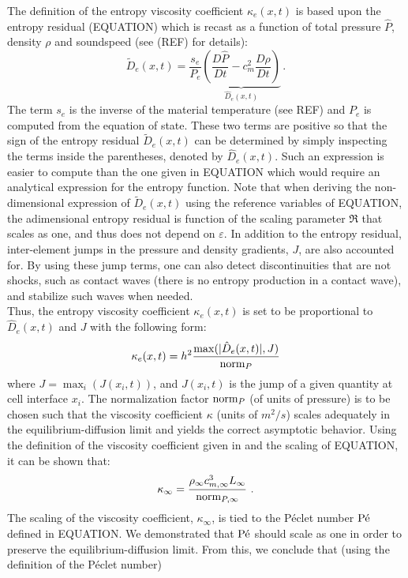 \documentclass[review]{elsarticle}
\begin{document}
The definition of the entropy viscosity coefficient $\kappa_e(x,t)$ is based upon the entropy residual (EQUATION) which is recast as a function of total pressure $\hat{P}$, density $\rho$ and soundspeed (see (REF) for details):
\begin{equation}
\label{eq:equation9}
\tilde{D}_e(x,t) = \frac{s_e}{P_e} \underbrace{ \left( \frac{D\hat{P}}{Dt} - c_m^2 \frac{D\rho}{Dt} \right)}_\textrm{$\hat{D}_e(x,t)$} \,.
\end{equation}
The term $s_e$ is the inverse of the material temperature (see REF) and $P_e$ is computed from the equation of state. These two terms are positive so that the sign of the entropy residual $\tilde{D}_e(x,t)$ can be determined by simply inspecting the terms inside the parentheses, denoted by $\hat{D}_e(x,t)$. Such an expression is easier to compute than the one given in EQUATION which would require an analytical expression for the entropy function. Note that when deriving the non-dimensional expression of $\tilde{D}_e(x,t)$ using the reference variables of EQUATION, the adimensional entropy residual is function of the scaling parameter $\Re$ that scales as one, and thus does not depend on $\varepsilon$. In addition to the entropy residual, inter-element jumps in the pressure and density gradients, $J$, are also accounted for. By using these jump terms, one can also detect discontinuities that are not shocks, such as contact waves (there is no entropy production in a contact wave), and stabilize such waves when needed. \\
Thus, the entropy viscosity coefficient $\kappa_e(x,t)$ is set to be proportional to $\hat{D}_e(x,t)$ and $J$ with the following form: 
\begin{equation}
\label{eq:equation12}
\kappa_e(x,t) = h^2 \frac{\max (|\hat{D}_e(x,t)|, J)}{\textrm{norm}_P}
\end{equation} 
where $J = \max_i (J(x_i,t))$, and $J(x_i,t)$ is the jump of a given quantity at cell interface $x_i$. The normalization factor $\textrm{norm}_P$ (of units of pressure) is to be chosen such that the viscosity coefficient $\kappa$ (units of $m^2/s$) scales adequately in the equilibrium-diffusion limit and yields the correct asymptotic behavior. Using the definition of the viscosity coefficient given in  and the scaling of EQUATION, it can be shown that:
%
\begin{equation}\label{eq:kappa_infty}
\kappa_\infty = \frac{\rho_\infty c^3_{m,\infty}  L_\infty}{\textrm{norm}_{P,\infty}} \ .
\end{equation}
%
The scaling of the viscosity coefficient, $\kappa_\infty$, is tied to the P\'eclet number $\textrm{P\'e}$ defined in EQUATION. We demonstrated that $\textrm{P\'e}$ should scale as one in order to preserve the equilibrium-diffusion limit. From this, we conclude that (using the definition of the P\'eclet number) 
\end{document}
